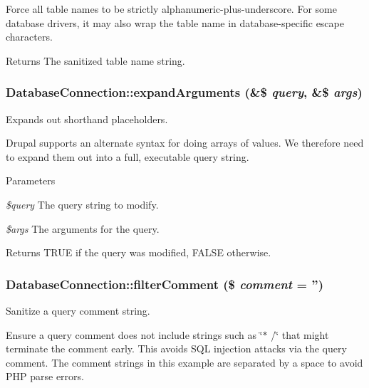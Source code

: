 Force all table names to be strictly alphanumeric-\/plus-\/underscore. For some database drivers, it may also wrap the table name in database-\/specific escape characters.

\begin{DoxyReturn}{Returns}
The sanitized table name string. 
\end{DoxyReturn}
\hypertarget{classDatabaseConnection_a4ba47f85f7a45b83de78af6acb1c059a}{
\subsubsection[{expandArguments}]{\setlength{\rightskip}{0pt plus 5cm}DatabaseConnection::expandArguments (\&\$ {\em query}, \/  \&\$ {\em args})}}
\label{classDatabaseConnection_a4ba47f85f7a45b83de78af6acb1c059a}
Expands out shorthand placeholders.

Drupal supports an alternate syntax for doing arrays of values. We therefore need to expand them out into a full, executable query string.


\begin{DoxyParams}{Parameters}
\item[{\em \$query}]The query string to modify. \item[{\em \$args}]The arguments for the query.\end{DoxyParams}
\begin{DoxyReturn}{Returns}
TRUE if the query was modified, FALSE otherwise. 
\end{DoxyReturn}
\hypertarget{classDatabaseConnection_a68426a046aed8dcc9a70fcd5734f226c}{
\subsubsection[{filterComment}]{\setlength{\rightskip}{0pt plus 5cm}DatabaseConnection::filterComment (\$ {\em comment} = {\ttfamily ''})}}
\label{classDatabaseConnection_a68426a046aed8dcc9a70fcd5734f226c}
Sanitize a query comment string.

Ensure a query comment does not include strings such as \char`\"{}$\ast$ /\char`\"{} that might terminate the comment early. This avoids SQL injection attacks via the query comment. The comment strings in this example are separated by a space to avoid PHP parse errors.

